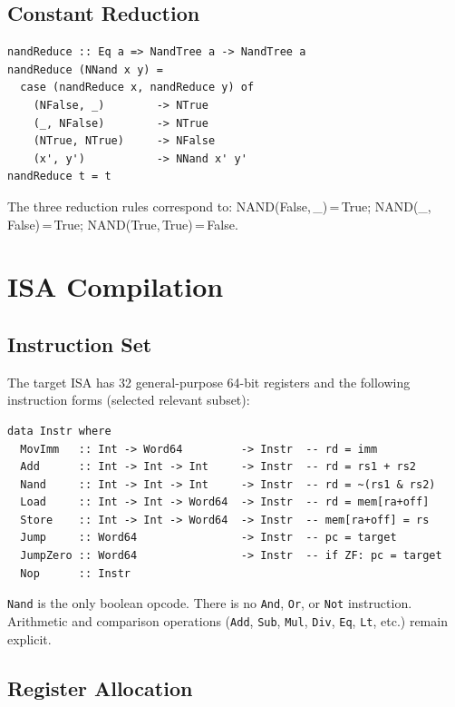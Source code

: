 \documentclass[sigconf,natbib=false]{acmart}
\begin{document}
\subsection{Constant Reduction}

\begin{lstlisting}[style=haskell,caption={nandReduce}]
nandReduce :: Eq a => NandTree a -> NandTree a
nandReduce (NNand x y) =
  case (nandReduce x, nandReduce y) of
    (NFalse, _)        -> NTrue
    (_, NFalse)        -> NTrue
    (NTrue, NTrue)     -> NFalse
    (x', y')           -> NNand x' y'
nandReduce t = t
\end{lstlisting}

The three reduction rules correspond to: NAND(False,\,\_)\,=\,True;
NAND(\_,\,False)\,=\,True; NAND(True,\,True)\,=\,False.


\section{ISA Compilation}
\label{sec:isa}

\subsection{Instruction Set}

The target ISA has 32 general-purpose 64-bit registers and the following
instruction forms (selected relevant subset):

\begin{lstlisting}[style=haskell,caption={Instruction GADT (excerpt)}]
data Instr where
  MovImm   :: Int -> Word64         -> Instr  -- rd = imm
  Add      :: Int -> Int -> Int     -> Instr  -- rd = rs1 + rs2
  Nand     :: Int -> Int -> Int     -> Instr  -- rd = ~(rs1 & rs2)
  Load     :: Int -> Int -> Word64  -> Instr  -- rd = mem[ra+off]
  Store    :: Int -> Int -> Word64  -> Instr  -- mem[ra+off] = rs
  Jump     :: Word64                -> Instr  -- pc = target
  JumpZero :: Word64                -> Instr  -- if ZF: pc = target
  Nop      :: Instr
\end{lstlisting}

\texttt{Nand} is the only boolean opcode. There is no \texttt{And}, \texttt{Or},
or \texttt{Not} instruction. Arithmetic and comparison operations (\texttt{Add},
\texttt{Sub}, \texttt{Mul}, \texttt{Div}, \texttt{Eq}, \texttt{Lt}, etc.)
remain explicit.

\subsection{Register Allocation}
\end{document}
